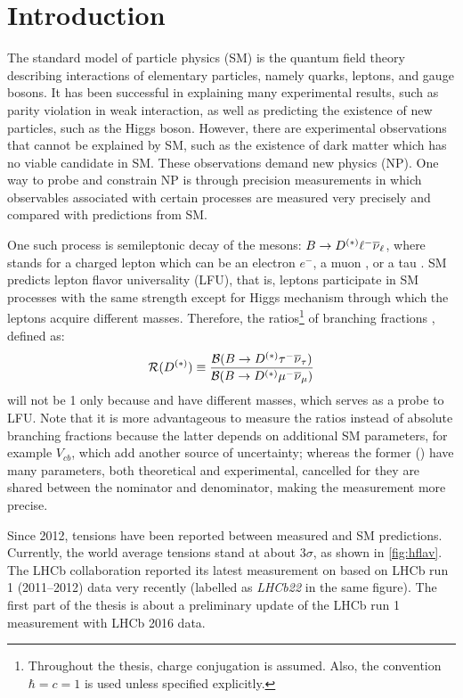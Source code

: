 \chapter{Introduction}

The standard model of particle physics (SM)
is the quantum field theory describing interactions of elementary particles,
namely quarks, leptons, and gauge bosons.
It has been successful in explaining many experimental results, such as parity
violation in weak interaction,
as well as predicting the existence of new particles, such as the Higgs boson.
However,
there are experimental observations that cannot be explained by SM,
such as the existence of dark matter
which has no viable candidate in SM.
These observations demand new physics (NP).
One way to probe and constrain NP is through precision measurements
in which observables associated with certain processes are measured very
precisely and compared with predictions from SM.

One such process is semileptonic decay of the \B mesons:
$B \rightarrow D^{(*)} {\ell^-} {{\overline{\nu}}_\ell}$,
where \ellm stands for a charged lepton which can be an electron $e^-$,
a muon \mun, or a tau \taum.
SM predicts lepton flavor universality (LFU),
that is, leptons participate in SM processes with the same strength
except for Higgs mechanism through which the leptons acquire different masses.
Therefore,
the ratios\footnote{
    Throughout the thesis, charge conjugation is assumed.
    Also, the convention $\hbar = c = 1$ is used unless specified explicitly.
} of branching fractions \RDX, defined as:
\begin{equation}
    \mathcal{R}(D^{(*)}) \equiv \frac{\mathcal{B}(B \rightarrow D^{(*)} {\tau^-} {{\overline{\nu}}_\tau})}{\mathcal{B}(B \rightarrow D^{(*)} {\mu^-} {{\overline{\nu}}_\mu})}
\end{equation}
will not be 1 only because \taum and \mun have different masses,
which serves as a probe to LFU.
Note that it is more advantageous to measure the ratios instead of absolute
branching fractions because the latter depends on additional SM parameters,
for example $V_{cb}$,
which add another source of uncertainty;
whereas the former (\RDX) have many parameters, both theoretical and
experimental, cancelled for they are shared between the nominator and
denominator, making the measurement more precise.

Since 2012, tensions have been reported between measured \RDX and SM
predictions.
Currently, the world average tensions stand at about $3 \sigma$,
as shown in \cref{fig:hflav}.
The LHCb collaboration reported its latest measurement on \RDX based on LHCb run
1 (2011--2012) data very recently
(labelled as \emph{LHCb22} in the same figure).
The first part of the thesis is about a preliminary update of the LHCb run 1
measurement with LHCb 2016 data.

